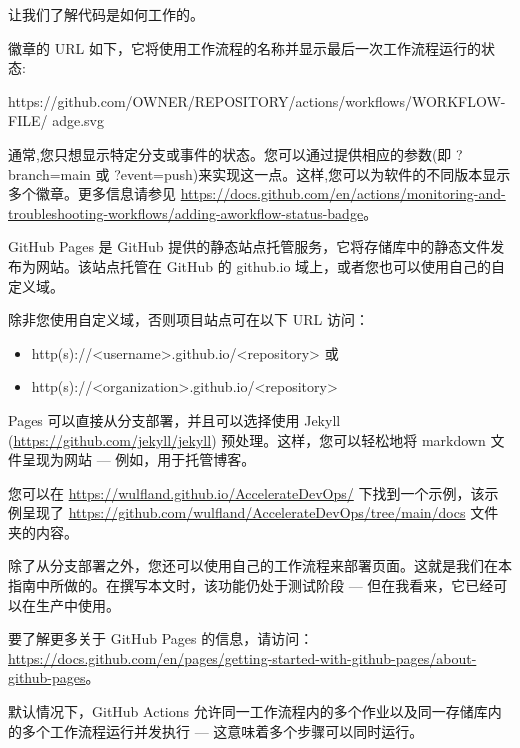 让我们了解代码是如何工作的。


徽章的 URL 如下，它将使用工作流程的名称并显示最后一次工作流程运行的状态:

\begin{shell}
https://github.com/OWNER/REPOSITORY/actions/workflows/WORKFLOW-FILE/ adge.svg
\end{shell}

通常,您只想显示特定分支或事件的状态。您可以通过提供相应的参数(即 ?branch=main 或 ?event=push)来实现这一点。这样,您可以为软件的不同版本显示多个徽章。更多信息请参见 \url{ https://docs.github.com/en/actions/monitoring-and-troubleshooting-workflows/adding-aworkflow-status-badge}。


GitHub Pages 是 GitHub 提供的静态站点托管服务，它将存储库中的静态文件发布为网站。该站点托管在 GitHub 的 github.io 域上，或者您也可以使用自己的自定义域。

除非您使用自定义域，否则项目站点可在以下 URL 访问：

\begin{itemize}
\item 
http(s)://<username>.github.io/<repository> 或

\item 
http(s)://<organization>.github.io/<repository>
\end{itemize}

Pages 可以直接从分支部署，并且可以选择使用 Jekyll (\url{https://github.com/jekyll/jekyll}) 预处理。这样，您可以轻松地将 markdown 文件呈现为网站 --- 例如，用于托管博客。

您可以在 \url{https://wulfland.github.io/AccelerateDevOps/} 下找到一个示例，该示例呈现了 \url{https://github.com/wulfland/AccelerateDevOps/tree/main/docs} 文件夹的内容。

除了从分支部署之外，您还可以使用自己的工作流程来部署页面。这就是我们在本指南中所做的。在撰写本文时，该功能仍处于测试阶段 --- 但在我看来，它已经可以在生产中使用。

要了解更多关于 GitHub Pages 的信息，请访问：\url{https://docs.github.com/en/pages/getting-started-with-github-pages/about-github-pages}。


默认情况下，GitHub Actions 允许同一工作流程内的多个作业以及同一存储库内的多个工作流程运行并发执行 --- 这意味着多个步骤可以同时运行。

